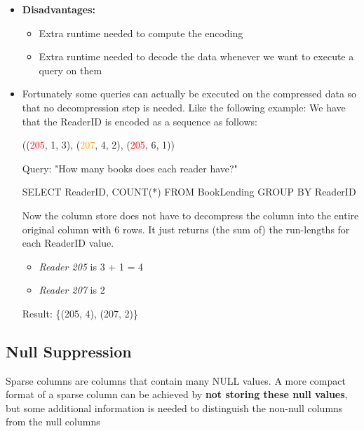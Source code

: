 \begin{itemize}
\begin{itemize}
        \item \textbf{Disadvantages:}
        \begin{itemize}
            \item Extra runtime needed to compute the encoding
            \item Extra runtime needed to decode the data whenever we want to execute a query on them
        \end{itemize}
        \item Fortunately some queries can actually be executed on the compressed data so that no decompression step is needed. Like the following example:
        \vspace{0.3cm}
        We have that the ReaderID is encoded as a sequence as follows:
        \vspace{0.3cm}
        
        \centerline{((\textcolor{red}{205}, 1, 3), (\textcolor{orange}{207}, 4, 2), (\textcolor{red}{205}, 6, 1))}
        \vspace{0.3cm}
        Query: "How many books does each reader have?"
        \vspace{0.3cm}
        
        \centerline{SELECT ReaderID, COUNT(*) FROM BookLending GROUP BY ReaderID}
        \vspace{0.3cm}
        Now the column store does not have to decompress the column into the entire original column with 6 rows. It just returns (the sum of) the run-lengths for each ReaderID value.
        \begin{itemize}
            \item \textit{Reader 205} is 3 + 1 = 4
            \item \textit{Reader 207} is 2
        \end{itemize}
        
        \centerline{Result: \{(205, 4), (207, 2)\}}
    \end{itemize}
 \end{itemize}
 
\subsection{Null Suppression}
Sparse columns are columns that contain many NULL values. A more compact format of a sparse column can be achieved by \textbf{not storing these null values}, but some additional information is needed to distinguish the non-null columns from the null columns

